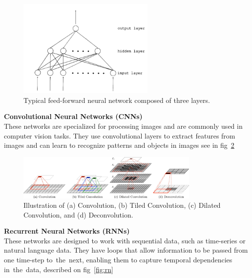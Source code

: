     \begin{center}
        \begin{figure}[!ht]
            \centering
            \includegraphics[width=0.6\textwidth]{figures/ff}
            \caption{Typical feed-forward neural network composed of three layers. \cite{svozil1997quantum}}
            \label{fig:ff}
        \end{figure}
    \end{center}
\textbf{Convolutional Neural Networks (CNNs)}\\
These networks are specialized for processing images and are commonly used in computer vision tasks. They use convolutional layers to extract features from images and can learn to recognize patterns and objects in images see in fig~\ref{fig:cn}
    \begin{center}
        \begin{figure}[!ht]
            \centering
            \includegraphics[width=0.8\textwidth]{figures/cn}
            \caption{Illustration of (a) Convolution, (b) Tiled Convolution, (c) Dilated Convolution, and (d)
                Deconvolution. \cite{GU2018354}}
            \label{fig:cn}
        \end{figure}
    \end{center}
\textbf{Recurrent Neural Networks (RNNs)}\\
These networks are designed to work with sequential data, such as time-series or natural language data. They have loops that allow information to be passed from one time-step to~the~next, enabling them to capture temporal dependencies in~the~data, described on fig~\ref{fig:rn}
